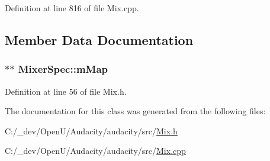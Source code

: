 Definition at line 816 of file Mix.\+cpp.



\subsection{Member Data Documentation}
\subsubsection[{\texorpdfstring{m\+Map}{mMap}}]{$\ast$$\ast$ Mixer\+Spec\+::m\+Map}\hypertarget{class_mixer_spec_ac9454ca9056651ce7a640c26d64e086a}{}\label{class_mixer_spec_ac9454ca9056651ce7a640c26d64e086a}


Definition at line 56 of file Mix.\+h.



The documentation for this class was generated from the following files\+:\begin{DoxyCompactItemize}
\item 
C\+:/\+\_\+dev/\+Open\+U/\+Audacity/audacity/src/\hyperlink{_mix_8h}{Mix.\+h}\item 
C\+:/\+\_\+dev/\+Open\+U/\+Audacity/audacity/src/\hyperlink{_mix_8cpp}{Mix.\+cpp}\end{DoxyCompactItemize}

